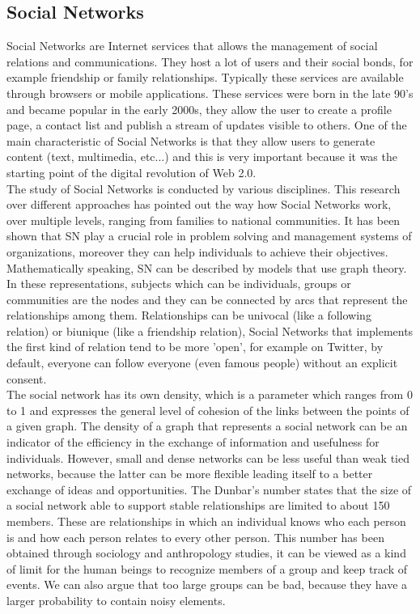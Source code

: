 \subsection{Social Networks}
\noindent Social Networks are Internet services that allows the management of social relations and communications. They host a lot of users and their social bonds, for example friendship or family relationships. Typically these services are available through browsers or mobile applications. These services were born in the late 90's and became popular in the early 2000s, they allow the user to create a profile page, a contact list and publish a stream of updates visible to others. One of the main characteristic of Social Networks is that they allow users to generate content (text, multimedia, etc...) and this is very important because it was the starting point of the digital revolution of Web 2.0.
\\
The study of Social Networks is conducted by various disciplines. This research over different approaches has pointed out the way how Social Networks work, over multiple levels, ranging from families to national communities. It has been shown that SN play a crucial role in problem solving and management systems of organizations, moreover they can help individuals to achieve their objectives.
\\
Mathematically speaking, SN can be described by models that use graph theory. In these representations, subjects which can be individuals, groups or communities are the nodes and they can be connected by arcs that represent the relationships among them. Relationships can be univocal (like a following relation) or biunique (like a friendship relation), Social Networks that implements the first kind of relation tend to be more 'open', for example on Twitter, by default, everyone can follow everyone (even famous people) without an explicit consent.
\\
The social network has its own density, which is a parameter which ranges from 0 to 1 and expresses the general level of cohesion of the links between the points of a given graph. The density of a graph that represents a social network can be an indicator of the efficiency in the exchange of information and usefulness for individuals. However, small and dense networks can be less useful than weak tied networks, because the latter can be more flexible leading itself to a better exchange of ideas and opportunities. The Dunbar's number states that the size of a social network able to support stable relationships are limited to about 150 members. These are relationships in which an individual knows who each person is and how each person relates to every other person. This number has been obtained through sociology and anthropology studies, it can be viewed as a kind of limit for the human beings to recognize members of a group and keep track of events. We can also argue that too large groups can be bad, because they have a larger probability to contain noisy elements.

